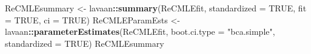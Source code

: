 \documentclass[
  11pt,
]{book}
\newenvironment{Shaded}{\begin{snugshade}}{\end{snugshade}}
\newcommand{\AttributeTok}[1]{\textcolor[rgb]{0.27,0.27,0.27}{#1}}
\newcommand{\ConstantTok}[1]{\textcolor[rgb]{0.37,0.37,0.37}{#1}}
\newcommand{\FunctionTok}[1]{\textcolor[rgb]{0.27,0.27,0.27}{\textbf{#1}}}
\newcommand{\NormalTok}[1]{#1}
\newcommand{\OtherTok}[1]{\textcolor[rgb]{0.37,0.37,0.37}{#1}}
\newcommand{\SpecialCharTok}[1]{\textcolor[rgb]{0.43,0.43,0.43}{\textbf{#1}}}
\newcommand{\StringTok}[1]{\textcolor[rgb]{0.5,0.5,0.5}{#1}}
\begin{document}
\begin{Shaded}
\begin{Highlighting}[]
\NormalTok{ReCMLEsummary }\OtherTok{\textless{}{-}}\NormalTok{ lavaan}\SpecialCharTok{::}\FunctionTok{summary}\NormalTok{(ReCMLEfit, }\AttributeTok{standardized =} \ConstantTok{TRUE}\NormalTok{, }\AttributeTok{fit =} \ConstantTok{TRUE}\NormalTok{,}
    \AttributeTok{ci =} \ConstantTok{TRUE}\NormalTok{)}
\NormalTok{ReCMLEParamEsts }\OtherTok{\textless{}{-}}\NormalTok{ lavaan}\SpecialCharTok{::}\FunctionTok{parameterEstimates}\NormalTok{(ReCMLEfit, }\AttributeTok{boot.ci.type =} \StringTok{"bca.simple"}\NormalTok{,}
    \AttributeTok{standardized =} \ConstantTok{TRUE}\NormalTok{)}
\NormalTok{ReCMLEsummary}
\end{Highlighting}
\end{Shaded}
\end{document}
